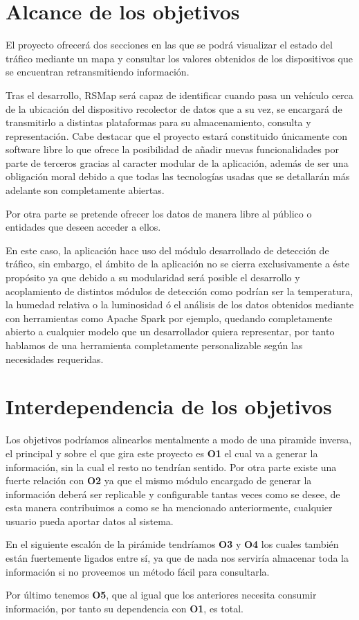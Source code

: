 \section{Alcance de los objetivos}

El proyecto ofrecerá dos secciones en las que se podrá visualizar el estado del tráfico mediante un mapa y consultar los valores obtenidos de los dispositivos que se encuentran retransmitiendo información.

\bigskip
Tras el desarrollo, RSMap será capaz de identificar cuando pasa un vehículo cerca de la ubicación del dispositivo recolector de datos que a su vez, se encargará de transmitirlo a distintas plataformas para su almacenamiento, consulta y representación. Cabe destacar que el proyecto estará constituido únicamente con software libre lo que ofrece la posibilidad de añadir nuevas funcionalidades por parte de terceros gracias al caracter modular de la aplicación, además de ser una obligación moral debido a que todas las tecnologías usadas que se detallarán más adelante son completamente abiertas.

Por otra parte se pretende ofrecer los datos de manera libre al público o entidades que deseen acceder a ellos.

\bigskip
En este caso, la aplicación hace uso del módulo desarrollado de detección de tráfico, sin embargo, el ámbito de la aplicación no se cierra exclusivamente a éste propósito ya que debido a su modularidad será posible el desarrollo y acoplamiento de distintos módulos de detección como podrían ser la temperatura, la humedad relativa o la luminosidad ó el análisis de los datos obtenidos mediante con herramientas como Apache Spark por ejemplo, quedando completamente abierto a cualquier modelo que un desarrollador quiera representar, por tanto hablamos de una herramienta completamente personalizable según las necesidades requeridas.


\section{Interdependencia de los objetivos}

Los objetivos podríamos alinearlos mentalmente a modo de una piramide inversa, el principal y sobre el que gira este proyecto es \textbf{O1} el cual va a generar la información, sin la cual el resto no tendrían sentido. Por otra parte existe una fuerte relación con \textbf{O2} ya que el mismo módulo encargado de generar la información deberá ser replicable y configurable tantas veces como se desee, de esta manera contribuimos a como se ha mencionado anteriormente, cualquier usuario pueda aportar datos al sistema.

En el siguiente escalón de la pirámide tendríamos \textbf{O3} y \textbf{O4} los cuales también están fuertemente ligados entre sí, ya que de nada nos serviría almacenar toda la información si no proveemos un método fácil para consultarla.

Por último tenemos \textbf{O5}, que al igual que los anteriores necesita consumir información, por tanto su dependencia con \textbf{O1}, es total.
